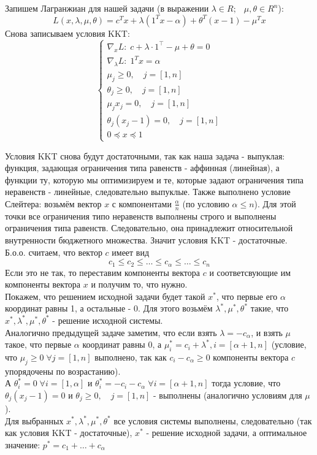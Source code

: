 \documentclass[a4paper,12pt]{article} %
\begin{document}
Запишем Лагранжиан для нашей задачи (в выражении $ \lambda \in R; \; \ \; \mu, \theta \in R^n $): 
$$
L(x, \lambda, \mu, \theta)=c^{T} x+\lambda\left(1^{T} x-\alpha\right)+\theta^{T}(x-1)-\mu^{T} x
$$
Снова записываем условия KKT:
$$
\left\{\begin{array}{l}
\nabla_x L: \; c+\lambda \cdot 1^{\top}-\mu + \theta=0 \\
\nabla_{\lambda} L: \; 1^{T} x= \alpha \\
\mu_{j} \geqslant 0 , \quad j=[1, n] \\
\theta_{j} \geqslant 0 , \quad j=[1, n] \\
\mu_{j} x_{j}=0, \quad j=[1, n] \\
\theta_{j} ( x_{j} - 1)=0, \quad j=[1, n] \\
0 \preceq  x \preceq 1
\end{array}\right.
$$

Условия KKT снова будут достаточными, так как наша задача - выпуклая: функция, задающая ограничения типа равенств - аффинная (линейная), а функции ту, которую мы оптимизируем и те, которые задают ограничения типа неравенств - линейные, следовательно выпуклые. Также выполнено условие Слейтера: возьмём вектор $ x $ с компонентами $ \frac{\alpha}{n} $ (по условию $ \alpha \leq n $). Для этой точки все ограничения типо неравенств выполнены строго и выполнены ограничения типа равенств. Следовательно, она принадлежит относительной внутренности бюджетного множества. Значит условия KKT - достаточные.\\

Б.о.о. считаем, что вектор $ c $ имеет вид
$$
c_{1} \leqslant c_{2} \leqslant \ldots \leqslant c_{\alpha} \leqslant \ldots \leqslant c_{n}
$$ 
Если это не так, то переставим компоненты вектора $ c $ и соответсвующие им компоненты вектора $ x $ и получим то, что нужно.\\

Покажем, что решением исходной задачи будет такой $ x^* $, что первые его $ \alpha $ координат равны 1, а остальные - 0. Для этого возьмём $ \lambda^*, \mu^*, \theta^* $ такие, что $ x^*, \lambda^*, \mu^*, \theta^* $ - решение исходной системы.\\

Аналогично предыдущей задаче заметим, что если взять $ \lambda = -c_{\alpha} $, и взять $ \mu $ такое, что первые $ \alpha $ координат равны 0, а $ \mu_i^* = c_i + \lambda^*, i = [\alpha+1, n] $ (условие, что $ \mu_j \geq 0 \; \forall j = [1, n]$ выполнено, так как $ c_i - c_{\alpha} \geq 0  $ компоненты вектора $ c $ упорядочены по возрастанию).\\
А $ \theta^*_i = 0 \; \forall i = [1, \alpha]$ и $ \theta^*_i = -c_i-c_{\alpha} \; \forall i = [\alpha + 1, n] $ тогда условие, что $\theta_{j} ( x_{j} - 1)=0 $ и $\theta_{j} \geqslant 0 , \quad j=[1, n]$ - выполнены (аналогично условиям для $ \mu $). \\
Для выбранных  $ x^*, \lambda^*, \mu^*, \theta^* $ все условия системы выполнены, следовательно (так как условия KKT - достаточные), $ x^* $ - решение исходной задачи, а оптимальное значение: $ p^* = c_1 + \ldots + c_{\alpha} $ \\
\end{document}
